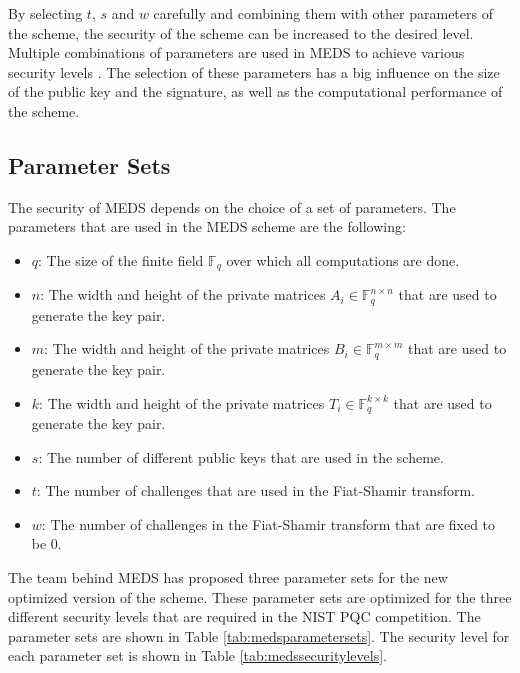 \documentclass[11pt,a4paper]{report}
\theoremstyle{definition}
\begin{document}
By selecting $t$, $s$ and $w$ carefully and combining them with other parameters of the scheme, the security of the scheme can be increased to the desired level. Multiple combinations of parameters are used in MEDS to achieve various security levels \cite{chou2023meds}. The selection of these parameters has a big influence on the size of the public key and the signature, as well as the computational performance of the scheme.

\subsection{Parameter Sets}
\label{sec:parametersets}
The security of MEDS depends on the choice of a set of parameters. The parameters that are used in the MEDS scheme are the following:
\begin{itemize}
  \item $q$: The size of the finite field $\mathbb{F}_q$ over which all computations are done.
  \item $n$: The width and height of the private matrices $A_i \in \mathbb{F}_q^{n \times n}$ that are used to generate the key pair.
  \item $m$: The width and height of the private matrices $B_i \in \mathbb{F}_q^{m \times m}$ that are used to generate the key pair.
  \item $k$: The width and height of the private matrices $T_i \in \mathbb{F}_q^{k \times k}$ that are used to generate the key pair.
  \item $s$: The number of different public keys that are used in the scheme.
  \item $t$: The number of challenges that are used in the Fiat-Shamir transform.
  \item $w$: The number of challenges in the Fiat-Shamir transform that are fixed to be 0.
\end{itemize}

The team behind MEDS has proposed three parameter sets for the new optimized version of the scheme. These parameter sets are optimized for the three different security levels that are required in the NIST PQC competition. The parameter sets are shown in Table \ref{tab:medsparametersets}. The security level for each parameter set is shown in Table \ref{tab:medssecuritylevels}.
\end{document}
